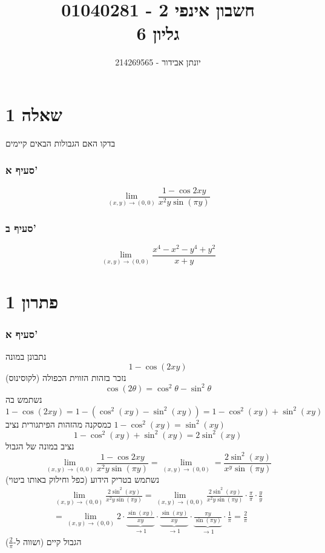 \documentclass[12pt, titlepage]{article}
\title{חשבון אינפי 2 - 01040281 \\ גליון 6}
\author{יונתן אבידור - 214269565}
\begin{document}
\maketitle
\pagestyle{fancy}
\fancyhead{}
\part*{שאלה 1}
בדקו האם הגבולות הבאים קיימים
\section*{סעיף א'}
\[
    \lim_{\left(x,y\right)\to\left(0,0\right)} \frac{1-\cos 2xy}{x^2y\sin \left(\pi y\right)}
\]
\section*{סעיף ב'}
\[
    \lim_{\left(x,y\right)\to\left(0,0\right)} \frac{x^4-x^2-y^4+y^2}{x+y}
\]
\part*{פתרון 1}
\section*{סעיף א'}
נתבונן במונה
\[
    1-\cos\left(2xy\right)
\]
נזכר בזהות הזווית הכפולה (לקוסינוס)
\[
    \cos \left(2\theta\right) = \cos^2\theta - \sin^2\theta
\]
נשתמש בה
\[
1-\cos\left(2xy\right) = 1 - \left(\cos^2\left(xy\right) - \sin^2\left(xy\right)\right) = 1 - \cos^2\left(xy\right) + \sin^2\left(xy\right)
\]
כמסקנה מהזהות הפיתגורית נציב $1-\cos^2\left(xy\right) = \sin^2\left(xy\right)$
\[
 1 - \cos^2\left(xy\right) + \sin^2\left(xy\right) = 2\sin^2\left(xy\right)
\]
נציב במונה של הגבול
\[
    \lim_{\left(x,y\right)\to\left(0,0\right)} \frac{1-\cos 2xy}{x^2y\sin \left(\pi y\right)} = \lim_{\left(x,y\right) \to \left(0,0\right)} = \frac{2\sin^2\left(xy\right)}{x^y\sin\left(\pi y\right)}
\]
נשתמש בטריק הידוע (כפל וחילוק באותו ביטוי)
\begin{gather*}
    \lim_{\left(x,y\right) \to \left(0,0\right)} \frac{2\sin^2\left(xy\right)}{x^2 y\sin\left(\pi y\right)} = \lim_{\left(x,y\right)\to\left(0,0\right)} \frac{2\sin^2\left(xy\right)}{x^2y\sin\left(\pi y\right)} \cdot \frac{\pi}{\pi} \cdot \frac{y}{y} \\
= \lim_{\left(x,y\right) \to\left(0,0\right)} 2 \cdot \underbrace{\frac{\sin\left(xy\right)}{xy}}_{\to 1}\cdot\underbrace{\frac{\sin\left(xy\right)}{xy}}_{\to 1} \cdot \underbrace{\frac{\pi y}{\sin\left(\pi y\right)}}_{\to 1} \cdot \frac{1}{\pi} = \boxed{\frac{2}{\pi}}
\end{gather*}
הגבול קיים (ושווה ל-$\frac{2}{\pi}$)
\end{document}
